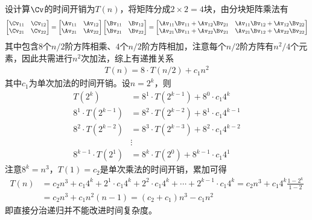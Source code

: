 \documentclass{ctexart}
\begin{document}
设计算$\Cv$的时间开销为$T(n)$，将矩阵分成$2 \times 2 = 4$块，由分块矩阵乘法有
\begin{align*}
    \begin{bmatrix}
        \Cv_{11} & \Cv_{12} \\ \Cv_{21} & \Cv_{22}
    \end{bmatrix} =
    \begin{bmatrix}
        \Av_{11} & \Av_{12} \\ \Av_{21} & \Av_{22}
    \end{bmatrix}
    \begin{bmatrix}
        \Bv_{11} & \Bv_{12} \\ \Bv_{21} & \Bv_{22}
    \end{bmatrix} =
    \begin{bmatrix}
        \Av_{11} \Bv_{11} + \Av_{12} \Bv_{21} & \Av_{11} \Bv_{12} + \Av_{12} \Bv_{22} \\
        \Av_{21} \Bv_{11} + \Av_{22} \Bv_{21} & \Av_{21} \Bv_{12} + \Av_{22} \Bv_{22}
    \end{bmatrix}
\end{align*}
其中包含$8$个$n/2$阶方阵相乘、$4$个$n/2$阶方阵相加，注意每个$n/2$阶方阵有$n^2/4$个元素，因此共需进行$n^2$次加法，综上有递推关系
\begin{align*}
    T(n) = 8 \cdot T(n/2) + c_1 n^2
\end{align*}
其中$c_1$为单次加法的时间开销。设$n = 2^k$，则
\begin{align*}
    T(2^k)               & = 8^1 \cdot T(2^{k-1}) + 8^0 \cdot c_1 4^k     \\
    8^1 \cdot T(2^{k-1}) & = 8^2 \cdot T(2^{k-2}) + 8^1 \cdot c_1 4^{k-1} \\
    8^2 \cdot T(2^{k-2}) & = 8^3 \cdot T(2^{k-3}) + 8^2 \cdot c_1 4^{k-2} \\
                         & \vdots                                         \\
    8^{k-1} \cdot T(2^1) & = 8^k \cdot T(2^0) + 8^{k-1} \cdot c_1 4^1
\end{align*}
注意$8^k = n^3$，$T(1) = c_2$是单次乘法的时间开销，累加可得
\begin{align*}
    T(n) & = c_2 n^3 + c_1 4^k + 2^1 \cdot c_1 4^k + 2^2 \cdot c_1 4^k + \cdots + 2^{k-1} \cdot c_1 4^k = c_2 n^3 + c_1 4^k \frac{1-2^k}{1-2} \\
         & = c_2 n^3 + c_1 n^2 (n-1) = (c_2 + c_1) n^3 - c_1 n^2
\end{align*}
即直接分治递归并不能改进时间复杂度。
\end{document}

